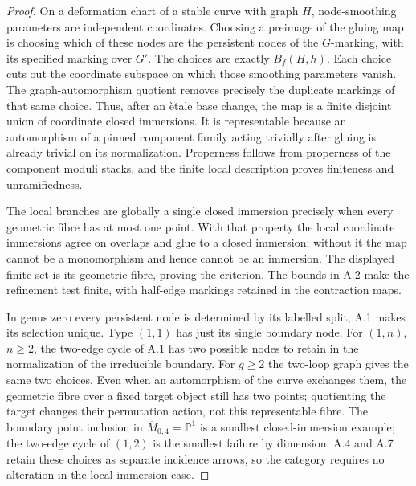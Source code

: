 \begin{proof}
On a deformation chart of a stable curve with graph $H$, node-smoothing parameters are independent coordinates. Choosing a preimage of the gluing map is choosing which of these nodes are the persistent nodes of the $G$-marking, with its specified marking over $G'$. The choices are exactly $B_f(H,h)$. Each choice cuts out the coordinate subspace on which those smoothing parameters vanish. The graph-automorphism quotient removes precisely the duplicate markings of that same choice. Thus, after an \`etale base change, the map is a finite disjoint union of coordinate closed immersions. It is representable because an automorphism of a pinned component family acting trivially after gluing is already trivial on its normalization. Properness follows from properness of the component moduli stacks, and the finite local description proves finiteness and unramifiedness.

The local branches are globally a single closed immersion precisely when every geometric fibre has at most one point. With that property the local coordinate immersions agree on overlaps and glue to a closed immersion; without it the map cannot be a monomorphism and hence cannot be an immersion. The displayed finite set is its geometric fibre, proving the criterion. The bounds in A.2 make the refinement test finite, with half-edge markings retained in the contraction maps.

In genus zero every persistent node is determined by its labelled split; A.1 makes its selection unique. Type $(1,1)$ has just its single boundary node. For $(1,n)$, $n\geq2$, the two-edge cycle of A.1 has two possible nodes to retain in the normalization of the irreducible boundary. For $g\geq2$ the two-loop graph gives the same two choices. Even when an automorphism of the curve exchanges them, the geometric fibre over a fixed target object still has two points; quotienting the target changes their permutation action, not this representable fibre. The boundary point inclusion in $\overline M_{0,4}=\mathbb P^1$ is a smallest closed-immersion example; the two-edge cycle of $(1,2)$ is the smallest failure by dimension. A.4 and A.7 retain these choices as separate incidence arrows, so the category requires no alteration in the local-immersion case.
\end{proof}


